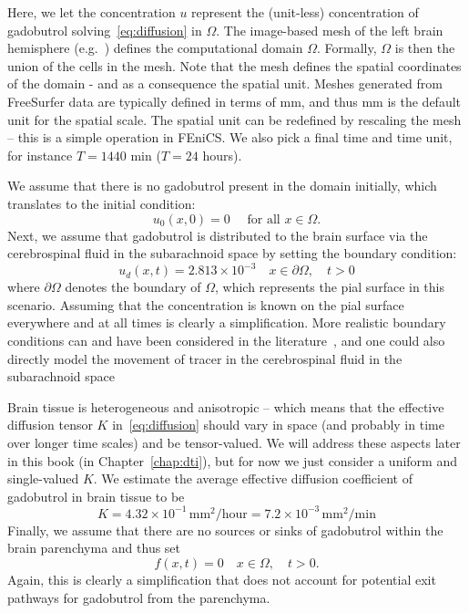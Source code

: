 Here, we let the concentration $u$ represent the (unit-less)
concentration of gadobutrol solving~\eqref{eq:diffusion} in
$\Omega$. The image-based mesh of the left brain hemisphere
(e.g.~) defines the computational domain
$\Omega$. Formally, $\Omega$ is then the union of the cells in the
mesh. Note that the mesh defines the spatial coordinates of the domain
- and as a consequence the spatial unit. Meshes generated from
FreeSurfer data are typically defined in terms of mm, and thus mm is
the default unit for the spatial scale. The spatial unit can be
redefined by rescaling the mesh -- this is a simple operation in
FEniCS. We also pick a final time and time unit, for instance $T =
1440$ min ($T = 24$ hours).

We assume that there is no gadobutrol present in the domain initially,
which translates to the initial condition:
\begin{equation}
  \label{eq:chp3:ic}
  u_0(x, 0) = 0 \quad \text{ for all } x \in \Omega.
\end{equation}
Next, we assume that gadobutrol is distributed to the brain surface
via the cerebrospinal fluid in the subarachnoid space by setting the
boundary condition:
\begin{equation}
  \label{eq:chp3:bc}
  u_d(x, t) = 2.813 \times 10^{-3} \quad x \in \partial \Omega, \quad t > 0
\end{equation}
where $\partial \Omega$ denotes the boundary of $\Omega$, which
represents the pial surface in this scenario. Assuming that the
concentration is known on the pial surface everywhere and at all times
is clearly a simplification. More realistic boundary conditions can
and have been considered in the literature~\cite{valnes2020apparent,
  croci2019uncertainty}, and one could also directly model the
movement of tracer in the cerebrospinal fluid in the subarachnoid
space~\cite{haga2017numerical,pizzichelli2017numerical}

Brain tissue is heterogeneous and anisotropic -- which means that the
effective diffusion tensor $K$ in~\eqref{eq:diffusion} should vary in
space (and probably in time over longer time scales) and be
tensor-valued. We will address these aspects later in this book (in
Chapter~\ref{chap:dti}), but for now we just consider a uniform and
single-valued $K$. We estimate the
average effective diffusion coefficient of gadobutrol in brain tissue
to be
\begin{equation}
  K  
  = 4.32 \times 10^{-1} \, \text{mm$^2$/hour}
  = 7.2 \times 10^{-3} \, \text{mm$^2$/min}
\end{equation}
Finally, we assume that there are no sources or sinks of gadobutrol
within the brain parenchyma and thus set
\begin{equation}
  f(x, t) = 0 \quad x \in \Omega, \quad t > 0.
\end{equation}
Again, this is clearly a simplification that does not account for
potential exit pathways for gadobutrol from the parenchyma.

